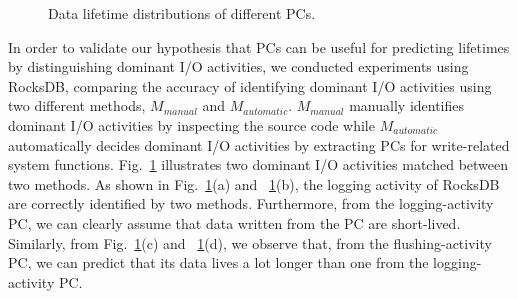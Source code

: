 \begin{figure}[!t]
\centering
\vspace{-10pt}
\hspace{1pt}
\hfill
\hfill
\vspace{-10pt}
\vspace{-10pt}
\caption{Data lifetime distributions of different PCs.} 
\label{fig:types_and_PCs}
\vspace{-15pt}
\end{figure}

In order to validate our hypothesis that PCs can be useful for predicting 
lifetimes by distinguishing dominant I/O activities, 
we conducted experiments using RocksDB, comparing the accuracy of 
identifying dominant I/O activities using two different methods, 
$M_{manual}$ and $M_{automatic}$.
$M_{manual}$ manually identifies dominant I/O activities by inspecting 
the source code while $M_{automatic}$ automatically decides dominant I/O 
activities by extracting PCs for write-related system functions. 
Fig.~\ref{fig:types_and_PCs} illustrates two dominant I/O activities 
matched between two methods.   
As shown in Fig.~\ref{fig:types_and_PCs}(a) and ~\ref{fig:types_and_PCs}(b), 
the logging activity of RocksDB are correctly identified by two methods.  
Furthermore, from the logging-activity PC, we can clearly assume that data 
written from the PC are short-lived.   
Similarly, from Fig.~\ref{fig:types_and_PCs}(c) and ~\ref{fig:types_and_PCs}(d), 
we observe that, from the flushing-activity PC, we can predict that its 
data lives a lot longer than one from the logging-activity PC.


